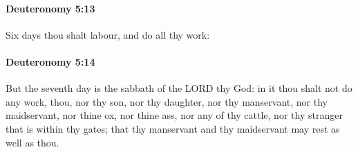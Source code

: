 		\paragraph{Deuteronomy 5:13} %
			\label{DEUTERONOMY-5-13}

			Six days thou shalt labour, and do all thy work:


		\paragraph{Deuteronomy 5:14} %
			\label{DEUTERONOMY-5-14}

			But the seventh day is the sabbath of the LORD thy God: in it thou shalt not do any work, thou, nor thy son, nor thy daughter, nor thy manservant, nor thy maidservant, nor thine ox, nor thine ass, nor any of thy cattle, nor thy stranger that is within thy gates; that thy manservant and thy maidservant may rest as well as thou.

